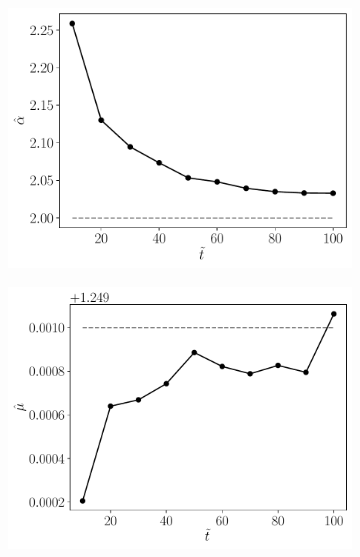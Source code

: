 \documentclass[11pt]{article}
\theoremstyle{definition}
\theoremstyle{remark}
\theoremstyle{remark}
\begin{document}
\begin{figure}[H]
  \centering
  \begin{subfigure}[b]{0.45\textwidth}
      \centering
      \includegraphics[scale=0.45]{alphas.pdf}
      \caption{}
  \end{subfigure}
  \begin{subfigure}[b]{0.45\textwidth}
      \centering
      \includegraphics[scale=0.45]{mus.pdf}
      \caption{}
  \end{subfigure}
  \begin{subfigure}[b]{0.45\textwidth}
      \centering

\end{subfigure}
\end{figure}
\end{document}
